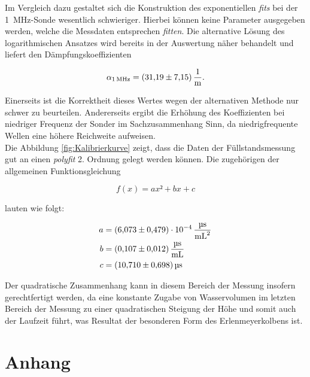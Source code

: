 \noindent Im Vergleich dazu gestaltet sich die Konstruktion des exponentiellen \emph{fits} bei der \qty{1}{\mega\hertz}-Sonde wesentlich 
schwieriger. Hierbei können keine Parameter ausgegeben werden, welche die Messdaten entsprechen \emph{fitten}. Die alternative Lösung des 
logarithmischen Ansatzes wird bereits in der Auswertung näher behandelt und liefert den Dämpfungskoeffizienten

\begin{align*}
    \alpha_{\qty{1}{\mega\hertz}} = \qty{31.19\pm7.15}{\per\meter}.
\end{align*}

\noindent Einerseits ist die Korrektheit dieses Wertes wegen der alternativen Methode nur schwer zu beurteilen. Andererseits 
ergibt die Erhöhung des Koeffizienten bei niedriger Frequenz der Sonder im Sachzusammenhang Sinn, da niedrigfrequente Wellen 
eine höhere Reichweite aufweisen.\\

\noindent Die Abbildung \ref{fig:Kalibrierkurve} zeigt, dass die Daten der Füllstandsmessung gut an einen \emph{polyfit} 2.
Ordnung gelegt werden können. Die zugehörigen der allgemeinen Funktionsgleichung

\begin{equation*}
    f(x) = ax² + bx + c
\end{equation*}

\noindent lauten wie folgt:

\begin{align*}
    a &= \qty{6.073\pm0.479e-4}{\micro\second\per\milli\liter\squared}\\  
    b &= \qty{0.107\pm0.012}{\micro\second\per\milli\liter}\\
    c &= \qty{10.71\pm0.698}{\micro\second }
\end{align*}

\noindent Der quadratische Zusammenhang kann in diesem Bereich der Messung insofern gerechtfertigt werden, da eine konstante 
Zugabe von Wasservolumen im letzten Bereich der Messung zu einer quadratischen Steigung der Höhe und somit auch der Laufzeit 
führt, was Resultat der besonderen Form des Erlenmeyerkolbens ist. 

\section{Anhang}

